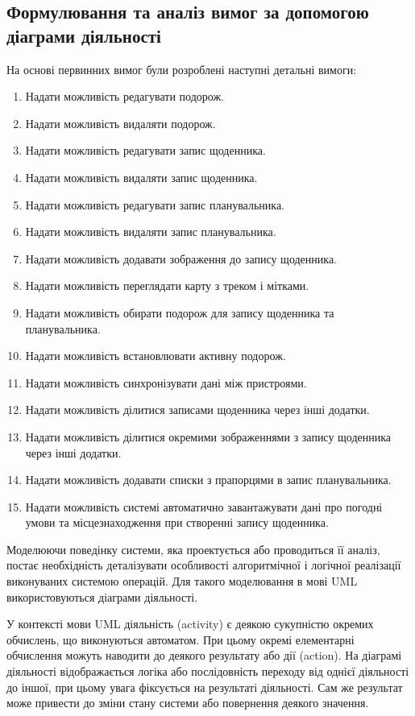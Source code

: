 \documentclass[../main.tex]{subfiles}
\begin{document}
\subsection{Формулювання та аналіз вимог за допомогою діаграми діяльності}
На основі первинних вимог були розроблені наступні детальні вимоги:
\begin{enumerate}
	\item Надати можливість редагувати подорож.
	\item Надати можливість видаляти подорож.
	\item Надати можливість редагувати запис щоденника.
	\item Надати можливість видаляти запис щоденника.
	\item Надати можливість редагувати запис планувальника.
	\item Надати можливість видаляти запис планувальника.
	\item Надати можливість додавати зображення до запису щоденника.
	\item Надати можливість переглядати карту з треком і мітками.
	\item Надати можливість обирати подорож для запису щоденника та планувальника.
	\item Надати можливість встановлювати активну подорож.
	\item Надати можливість синхронізувати дані між пристроями.
	\item Надати можливість ділитися записами щоденника через інші додатки.
	\item Надати можливість ділитися окремими зображеннями з запису щоденника через інші додатки.
	\item Надати можливість додавати списки з прапорцями в запис планувальника.
	\item Надати можливість системі автоматично завантажувати дані про погодні умови та місцезнаходження при створенні запису щоденника.
\end{enumerate}

Моделюючи поведінку системи, яка проектується або проводиться її аналіз, постає необхідність деталізувати особливості алгоритмічної і логічної реалізації виконуваних системою операцій. Для такого моделювання в мові UML використовуються діаграми діяльності.

У контексті мови UML діяльність (activity) є деякою сукупністю окремих обчислень, що виконуються автоматом. При цьому окремі елементарні обчислення можуть наводити до деякого результату або дії (action). На діаграмі діяльності відображається логіка або послідовність переходу від однієї діяльності до іншої, при цьому увага фіксується на результаті діяльності. Сам же результат може привести до зміни стану системи або повернення деякого значення.
\end{document}

